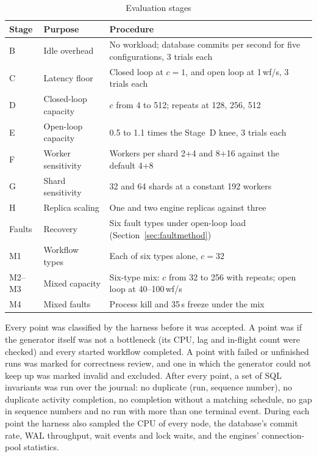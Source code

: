 \begin{table}[htbp]
  \centering
  \caption{Evaluation stages}
  \label{tab:stages}
  \small
  \begin{tabular}{|p{0.28in}|p{1.65in}|p{3.26in}|}
    \hline
    \textbf{Stage} & \textbf{Purpose} & \textbf{Procedure} \\
    \hline
    B & Idle overhead & No workload; database commits per second for five
      configurations, 3 trials each \\
    \hline
    C & Latency floor & Closed loop at $c=1$, and open loop at 1\,wf/s,
      3 trials each \\
    \hline
    D & Closed-loop capacity & $c$ from 4 to 512; repeats at 128, 256, 512 \\
    \hline
    E & Open-loop capacity & 0.5 to 1.1 times the Stage~D knee, 3 trials each \\
    \hline
    F & Worker sensitivity & Workers per shard 2+4 and 8+16 against the
      default 4+8 \\
    \hline
    G & Shard sensitivity & 32 and 64 shards at a constant 192 workers \\
    \hline
    H & Replica scaling & One and two engine replicas against three \\
    \hline
    Faults & Recovery & Six fault types under open-loop load
      (Section~\ref{sec:faultmethod}) \\
    \hline
    M1 & Workflow types & Each of six types alone, $c=32$ \\
    \hline
    M2--M3 & Mixed capacity & Six-type mix: $c$ from 32 to 256 with repeats; open
      loop at 40--100\,wf/s \\
    \hline
    M4 & Mixed faults & Process kill and 35\,s freeze under the mix \\
    \hline
  \end{tabular}
\end{table}

Every point was classified by the harness before it was accepted. A point was
 if the generator itself was not a bottleneck (its CPU, lag and
in-flight count were checked) and every started workflow completed. A point
with failed or unfinished runs was marked for correctness review, and one in
which the generator could not keep up was marked invalid and excluded. After
every point, a set of SQL invariants was run over the journal: no duplicate
(run, sequence number), no duplicate activity completion, no completion
without a matching schedule, no gap in sequence numbers and no run with more
than one terminal event. During each point the harness also sampled the CPU
of every node, the database's commit rate, WAL throughput, wait events and
lock waits, and the engines' connection-pool statistics.

